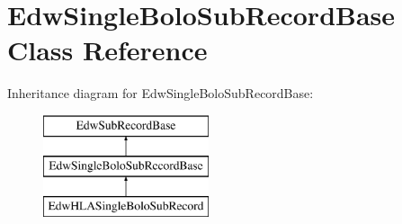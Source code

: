 \hypertarget{class_edw_single_bolo_sub_record_base}{
\section{EdwSingleBoloSubRecordBase Class Reference}
\label{class_edw_single_bolo_sub_record_base}
}
Inheritance diagram for EdwSingleBoloSubRecordBase:\begin{figure}[H]
\begin{center}
\leavevmode
\includegraphics[height=3cm]{class_edw_single_bolo_sub_record_base}
\end{center}
\end{figure}
